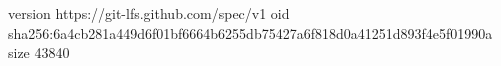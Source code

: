version https://git-lfs.github.com/spec/v1
oid sha256:6a4cb281a449d6f01bf6664b6255db75427a6f818d0a41251d893f4e5f01990a
size 43840
